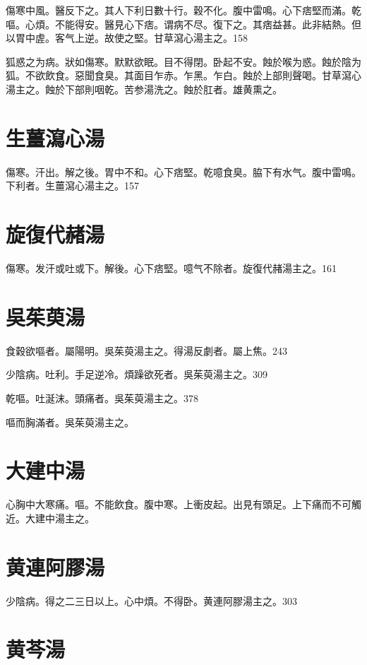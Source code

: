 \documentclass[b5paper,twoside,zihao=-4,UTF8]{ctexbook}
\begin{document}
傷寒中風。醫反下之。其人下利日數十行。穀不化。腹中雷鳴。心下痞堅而滿。乾嘔。心煩。不能得安。醫見心下痞。谓病不尽。復下之。其痞益甚。此非結熱。但以胃中虗。客气上逆。故使之堅。甘草瀉心湯主之。158

狐惑之为病。狀如傷寒。默默欲眠。目不得閉。卧起不安。蝕於喉为惑。蝕於陰为狐。不欲飲食。惡聞食臭。其面目乍赤。乍黑。乍白。蝕於上部則聲喝。甘草瀉心湯主之。蝕於下部則咽乾。苦参湯洗之。蝕於肛者。雄黄熏之。

\section{生薑瀉心湯}

傷寒。汗出。解之後。胃中不和。心下痞堅。乾噫食臭。脇下有水气。腹中雷鳴。下利者。生薑瀉心湯主之。157

\section{旋復代赭湯}

傷寒。发汗{或}吐{或}下。解後。心下痞堅。噫气不除者。旋復代赭湯主之。161

\section{吳茱萸湯}

食穀欲嘔者。屬陽明。{吳}茱萸湯主之。得湯反劇者。屬上焦。243

少陰病。吐利。手足逆{冷}。煩躁欲死者。{吳}茱萸湯主之。309

乾嘔。吐涎沫。頭痛者。吳茱萸湯主之。378

嘔而胸滿者。吳茱萸湯主之。

\section{大建中湯}

心胸中大寒痛。嘔。不能飲食。腹中寒。上衝皮起。出見有頭足。上下痛而不可觸近。大建中湯主之。

\section{黄連阿膠湯}

少陰病。得之二三日以上。心中煩。不得卧。黄連阿膠湯主之。303

\section{黄芩湯}
\end{document}

